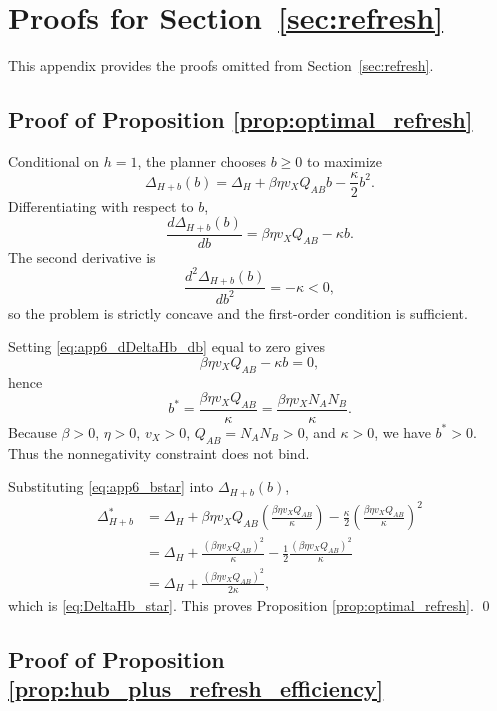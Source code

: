 \section{Proofs for Section~\ref{sec:refresh}}

This appendix provides the proofs omitted from Section~\ref{sec:refresh}.

\subsection{Proof of Proposition \ref{prop:optimal_refresh}}

Conditional on $h=1$, the planner chooses $b\ge 0$ to maximize
\[
\Delta_{H+b}(b)
=
\Delta_H+\beta\eta v_XQ_{AB}b-\frac{\kappa}{2}b^2.
\]
Differentiating with respect to $b$,
\begin{equation}
\frac{d\Delta_{H+b}(b)}{db}
=
\beta\eta v_XQ_{AB}-\kappa b.
\label{eq:app6_dDeltaHb_db}
\end{equation}
The second derivative is
\begin{equation}
\frac{d^2\Delta_{H+b}(b)}{db^2}
=
-\kappa<0,
\label{eq:app6_d2DeltaHb_db2}
\end{equation}
so the problem is strictly concave and the first-order condition is sufficient.

Setting \eqref{eq:app6_dDeltaHb_db} equal to zero gives
\[
\beta\eta v_XQ_{AB}-\kappa b=0,
\]
hence
\begin{equation}
b^*=
\frac{\beta\eta v_XQ_{AB}}{\kappa}
=
\frac{\beta\eta v_XN_AN_B}{\kappa}.
\label{eq:app6_bstar}
\end{equation}
Because $\beta>0$, $\eta>0$, $v_X>0$, $Q_{AB}=N_AN_B>0$, and $\kappa>0$, we have $b^*>0$. Thus the nonnegativity constraint does not bind.

Substituting \eqref{eq:app6_bstar} into $\Delta_{H+b}(b)$,
\begin{align}
\Delta_{H+b}^*
&=
\Delta_H
+
\beta\eta v_XQ_{AB}
\left(
\frac{\beta\eta v_XQ_{AB}}{\kappa}
\right)
-
\frac{\kappa}{2}
\left(
\frac{\beta\eta v_XQ_{AB}}{\kappa}
\right)^2
\nonumber\\
&=
\Delta_H
+
\frac{(\beta\eta v_XQ_{AB})^2}{\kappa}
-
\frac{1}{2}\frac{(\beta\eta v_XQ_{AB})^2}{\kappa}
\nonumber\\
&=
\Delta_H+\frac{(\beta\eta v_XQ_{AB})^2}{2\kappa},
\label{eq:app6_DeltaHb_star}
\end{align}
which is \eqref{eq:DeltaHb_star}. This proves Proposition \ref{prop:optimal_refresh}.
\qed

\subsection{Proof of Proposition \ref{prop:hub_plus_refresh_efficiency}}

